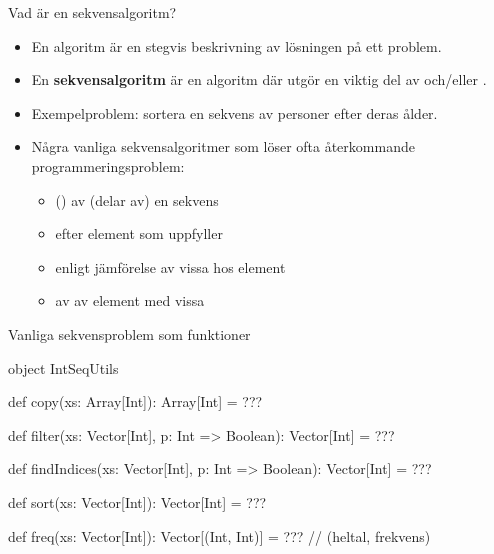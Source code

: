 
\begin{Slide}{Vad är en sekvensalgoritm?}\SlideFontSmall
\begin{itemize}
\item En algoritm är en stegvis beskrivning av lösningen på ett problem.
\item En \textbf{sekvensalgoritm} är en algoritm där  utgör en viktig del av  och/eller .


\item Exempelproblem: sortera en sekvens av personer efter deras ålder.

\pause

\item Några vanliga sekvensalgoritmer som löser ofta återkommande programmeringsproblem:

\begin{itemize}\SlideFontSmall
  \item {} () av (delar av) en sekvens
  \item {} efter element som uppfyller 
  \item {} enligt jämförelse av vissa  hos element
  \item {} av  av element med vissa 
\end{itemize}
\end{itemize}
\end{Slide}


\begin{Slide}{Vanliga sekvensproblem som funktioner}
\begin{Code}
object IntSeqUtils {
  def copy(xs: Array[Int]): Array[Int] = ???

  def filter(xs: Vector[Int], p: Int => Boolean): Vector[Int] = ???

  def findIndices(xs: Vector[Int], p: Int => Boolean): Vector[Int] = ???

  def sort(xs: Vector[Int]): Vector[Int] = ???

  def freq(xs: Vector[Int]): Vector[(Int, Int)] = ???  // (heltal, frekvens)
}
\end{Code}
\end{Slide}


